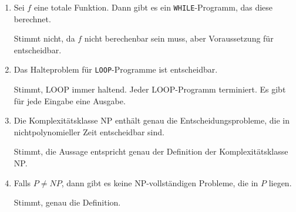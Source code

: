 \documentclass{lehramt-informatik-aufgabe}
\begin{document}
\begin{enumerate}

\item Sei $f$ eine totale Funktion. Dann gibt es ein
\texttt{WHILE}-Programm, das diese berechnet.

\begin{liAntwort}
Stimmt nicht, da $f$ nicht berechenbar sein muss, aber Voraussetzung für
entscheidbar.
\end{liAntwort}


\item Das Halteproblem für \texttt{LOOP}-Programme ist entscheidbar.

\begin{liAntwort}
Stimmt, LOOP immer haltend. Jeder LOOP-Programm terminiert. Es gibt für
jede Eingabe eine Ausgabe.
\end{liAntwort}


\item Die Komplexitätsklasse NP enthält genau die Entscheidungsprobleme,
die in nichtpolynomieller Zeit entscheidbar sind.

\begin{liAntwort}
Stimmt, die Aussage entspricht genau der Definition der
Komplexitätsklasse NP.
\end{liAntwort}


\item Falls $P \neq NP$, dann gibt es keine NP-vollständigen Probleme,
die in $P$ liegen.

\begin{liAntwort}
Stimmt, genau die Definition.
\end{liAntwort}

\end{enumerate}
\end{document}
